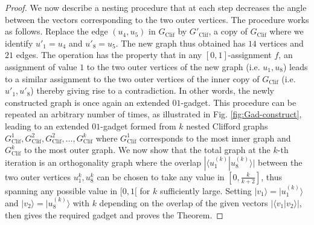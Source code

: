 \documentclass[twocolumn, a4paper, superscriptaddress,nofootinbib, accepted=2020-08-07, hyperref]{quantumarticle}
\begin{document}
\begin{proof}
We now describe a nesting procedure that at each step decreases the angle between the vectors corresponding to the two outer vertices. The procedure works as follows. Replace the edge $(u_4, u_5)$ in $G_{\text{Clif}}$ by $G'_{\text{Clif}}$, a copy of $G_{\text{Clif}}$ where we identify $u'_1=u_4$ and $u'_8=u_5$. The new graph thus obtained has $14$ vertices and $21$ edges. The operation has the property that in any $[0,1]$-assignment $f$, an assignment of value $1$ to the two outer vertices of the new graph (i.e. $u_1,u_8$) leads to a similar assignment to the two outer vertices of the inner copy of $G_{\text{Clif}}$ (i.e. $u'_1,u'_8$) thereby giving rise to a contradiction. In other words, the newly constructed graph is once again an extended $01$-gadget.  This procedure can be repeated an arbitrary number of times, as illustrated in Fig. \ref{fig:Gad-construct}, leading to an extended $01$-gadget formed from $k$ nested Clifford graphs $G_{\text{Clif}}^1,G_{\text{Clif}}^2,G_{\text{Clif}}^2,\ldots,G_{\text{Clif}}^k$ where $G_{\text{Clif}}^1$ corresponds to the most inner graph and $G_{\text{Clif}}^k$ to the most outer graph.
We now show that the total graph at the $k$-th iteration is an orthogonality graph where the overlap $|\langle u_1^{(k)} | u_8^{(k)} \rangle |$ between the two outer vertices $u_1^k,u_8^k$ can be chosen to take any value in $[0,\frac{k}{k+2}]$, thus spanning any possible value in $[0,1[$ for $k$ sufficiently large. 
Setting $|v_1 \rangle = |u_1^{(k)} \rangle$ and $|v_2 \rangle = |u_8^{(k)} \rangle$ with $k$ depending on the overlap of the given vectors $| \langle v_1 | v_2 \rangle|$, then gives the required gadget and proves the Theorem.




\end{proof}
\end{document}
